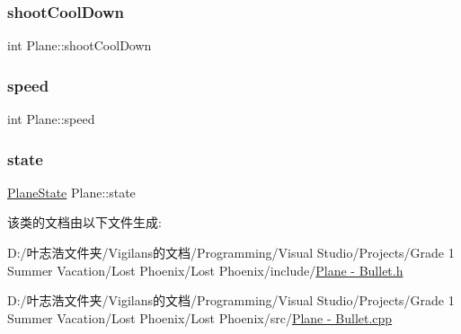 \mbox{\label{class_plane_ae9f4ab92b0aa75cff1f14df37980eabd}} 
\subsubsection{\texorpdfstring{shoot\+Cool\+Down}{shootCoolDown}}
{\footnotesize\ttfamily int Plane\+::shoot\+Cool\+Down}

\mbox{\label{class_plane_a6ca15b26a453dfd4f81fa11a5ee278c9}} 
\subsubsection{\texorpdfstring{speed}{speed}}
{\footnotesize\ttfamily int Plane\+::speed}

\mbox{\label{class_plane_a30babe177abbe22e61d2cc274945f3fc}} 
\subsubsection{\texorpdfstring{state}{state}}
{\footnotesize\ttfamily \hyperlink{_plane_01-_01_bullet_8h_a9f852e2715e13ec145d551659d2813bc}{Plane\+State} Plane\+::state\hspace{0.3cm}{\ttfamily [protected]}}



该类的文档由以下文件生成\+:\begin{DoxyCompactItemize}
\item 
D\+:/叶志浩文件夹/\+Vigilans的文档/\+Programming/\+Visual Studio/\+Projects/\+Grade 1 Summer Vacation/\+Lost Phoenix/\+Lost Phoenix/include/\hyperlink{_plane_01-_01_bullet_8h}{Plane -\/ Bullet.\+h}\item 
D\+:/叶志浩文件夹/\+Vigilans的文档/\+Programming/\+Visual Studio/\+Projects/\+Grade 1 Summer Vacation/\+Lost Phoenix/\+Lost Phoenix/src/\hyperlink{_plane_01-_01_bullet_8cpp}{Plane -\/ Bullet.\+cpp}\end{DoxyCompactItemize}
